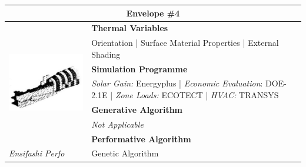 \begin{table}
	\begin{tabular}{ | m{6cm} | m{14cm} |}
	\toprule
	\multicolumn{2}{c}{Envelope \#{}4} \\[1cm] \hline
	\multirow{7}{*}{\includegraphics[width=5.5cm]{./Images/13-Envelope4}} & \textbf{Thermal Variables} \\[1cm]
	& Orientation | Surface Material Properties | External Shading\vspace{0.5cm}\\ \cline{2-2}
		 & \textbf{Simulation Programme} \\[1cm]
		 & \emph{Solar Gain:} Energyplus | \emph{Economic Evaluation}: DOE-2.1E | \emph{Zone Loads:} ECOTECT | \emph{HVAC:} TRANSYS \vspace{0.5cm}\\ \cline{2-2}
		 & \textbf{Generative Algorithm} \\[1cm]
		 & \emph{Not Applicable}\vspace{0.5cm}\\ \cline{2-2}
		 & \textbf{Performative Algorithm} \\[1cm]
		 \emph{Ensifashi Perfo} &  Genetic Algorithm\vspace{0.5cm}\\
	\bottomrule
	\end{tabular}
\end{table}

\clearpage

